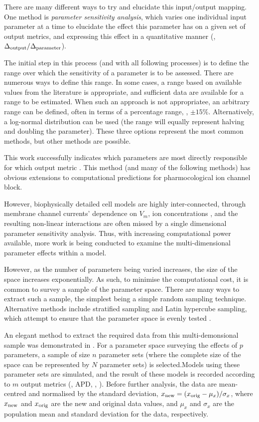 \documentclass[../thesis-main.tex]{subfiles}
\begin{document}
There are many different ways to try and elucidate this input/output mapping. One method is \emph{parameter sensitivity analysis}, which varies one individual input parameter at a time to elucidate the effect this parameter has on a given set of output metrics, and expressing this effect in a quantitative manner (\eg{}, $\Delta_\textnormal{output}/\Delta_\textnormal{parameter}$).

The initial step in this process (and with all following processes) is to define the range over which the sensitivity of a parameter is to be assessed. There are numerous ways to define this range. In some cases, a range based on available values from the literature is appropriate, and sufficient data are available for a range to be estimated. When such an approach is not appropriatee, an arbitrary range can be defined, often in terms of a percentage range, \eg{}, $\pm15\%$. Alternatively, a log-normal distribution can be used (the range will equally represent halving and doubling the parameter). These three options represent the most common methods, but other methods are possible.

This work successfully indicates which parameters are most directly responsible for which output metric \citep{Nygren1998, Romero2009, Romero2010, Corrias2011, Romero2011}. This method (and many of the following methods) has obvious extensions to computational predictions for pharmocological ion channel block.

However, biophysically detailed cell models are highly inter-connected, through membrane channel currents' dependence on $V_m$, ion concentrations \etc{}, and the resulting non-linear interactions are often missed by a single dimensional parameter sensitivity analysis. Thus, with increasing computational power available, more work is being conducted to examine the multi-dimensional parameter effects within a model.

However, as the number of parameters being varied increases, the size of the space increases exponentially. As such, to minimise the computational cost, it is common to survey a sample of the parameter space. There are many ways to extract such a sample, the simplest being a simple random sampling technique. Alternative methods include stratified sampling and Latin hypercube sampling, which attempt to ensure that the parameter space is evenly tested \citep{McKay1979}.

An elegant method to extract the required data from this multi-demonsional sample was demonstrated in \citet{Sobie2009}. For a parameter space surveying the effects of $p$ parameters, a sample of size $n$ parameter sets (where the complete size of the space can be represented by $N$ parameter sets) is selected.Models using these parameter sets are simulated, and the result of these models is recorded according to $m$ output metrics (\eg{}, APD, \casys{}, \etc{}). Before further analysis, the data are mean-centred and normalised by the standard deviation, \idest{} $x_\textnormal{new} = (x_\textnormal{orig}-\mu_x)/\sigma_x$, where $x_\textnormal{new}$ and $x_\textnormal{orig}$ are the new and original data values, and $\mu_x$ and $\sigma_x$ are the population mean and standard deviation for the data, respectively.
\end{document}
